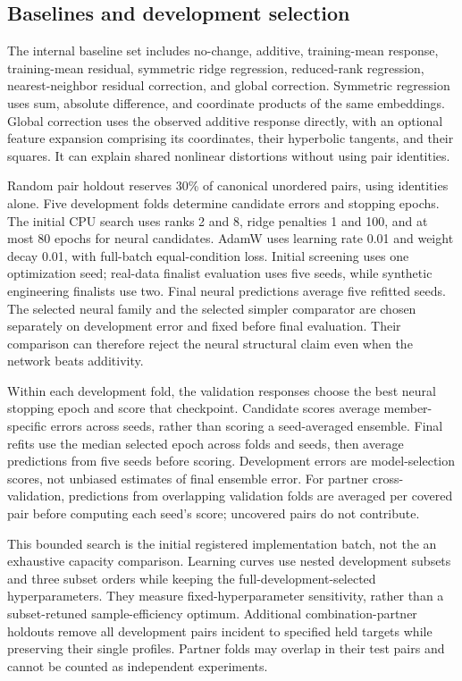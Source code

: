\documentclass{article}
\begin{document}
\subsection{Baselines and development selection}
The internal baseline set includes no-change, additive, training-mean response, training-mean residual, symmetric ridge regression, reduced-rank regression, nearest-neighbor residual correction, and global correction. Symmetric regression uses sum, absolute difference, and coordinate products of the same embeddings. Global correction uses the observed additive response directly, with an optional feature expansion comprising its coordinates, their hyperbolic tangents, and their squares. It can explain shared nonlinear distortions without using pair identities.

Random pair holdout reserves 30\% of canonical unordered pairs, using identities alone. Five development folds determine candidate errors and stopping epochs. The initial CPU search uses ranks 2 and 8, ridge penalties 1 and 100, and at most 80 epochs for neural candidates. AdamW uses learning rate 0.01 and weight decay 0.01, with full-batch equal-condition loss. Initial screening uses one optimization seed; real-data finalist evaluation uses five seeds, while synthetic engineering finalists use two. Final neural predictions average five refitted seeds. The selected neural family and the selected simpler comparator are chosen separately on development error and fixed before final evaluation. Their comparison can therefore reject the neural structural claim even when the network beats additivity.

Within each development fold, the validation responses choose the best neural stopping epoch and score that checkpoint. Candidate scores average member-specific errors across seeds, rather than scoring a seed-averaged ensemble. Final refits use the median selected epoch across folds and seeds, then average predictions from five seeds before scoring. Development errors are model-selection scores, not unbiased estimates of final ensemble error. For partner cross-validation, predictions from overlapping validation folds are averaged per covered pair before computing each seed's score; uncovered pairs do not contribute.

This bounded search is the initial registered implementation batch, not the an exhaustive capacity comparison. Learning curves use nested development subsets and three subset orders while keeping the full-development-selected hyperparameters. They measure fixed-hyperparameter sensitivity, rather than a subset-retuned sample-efficiency optimum. Additional combination-partner holdouts remove all development pairs incident to specified held targets while preserving their single profiles. Partner folds may overlap in their test pairs and cannot be counted as independent experiments.
\end{document}
